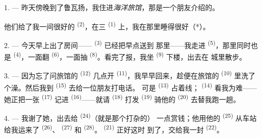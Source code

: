 %


\VUsaut{3.0mm}
\VUsaut{1.6mm}
\VUsaut{2.0mm}
\VUsaut{3.4mm}

1. --- 昨天傍晚到了鲁瓦扬，我住进\textit{海洋旅馆}，那是一个朋友介绍的。

他们给了我一间很好的 \textsuperscript{(2)}，在三
 \textsuperscript{(1)} 上，我在那里睡得很好（*）。

2. --- 今天早上出了房间—— \textsuperscript{(3)} 已经把早点送到
那里——我走进 \textsuperscript{(5)}，那里同时也是
\textsuperscript{(4)}，一面翻 \textsuperscript{(6)}，一面抽
\textsuperscript{(8)}。看完了报，我坐 \textsuperscript{(9)} 下楼，出去在
城里散步。

3. --- 因为忘了问旅馆的 \textsuperscript{(12)} 几点开 \textsuperscript{(11)}，我早早回来，趁便在旅馆的 \textsuperscript{(10)}
里洗了个澡。然后我到 \textsuperscript{(15)} 去给一位朋友打电话。
可是 \textsuperscript{(13)} 占着线； \textsuperscript{(14)}
看我为难——她正把一张 \textsuperscript{(17)} 记进
\textsuperscript{(16)}——就请 \textsuperscript{(18)} 打发
\textsuperscript{(19)} 骑他的 \textsuperscript{(20)} 去替我跑一趟。

4. --- 我谢了她，出去给 \textsuperscript{(24)}（就是那个打杂的）
一点赏钱；他用他的 \textsuperscript{(25)} 从车站给我运来了
 \textsuperscript{(26)}、 \textsuperscript{(27)} 和
 \textsuperscript{(28)}。 \textsuperscript{(21)} 正好这时
到了，交给我一封 \textsuperscript{(22)}。

